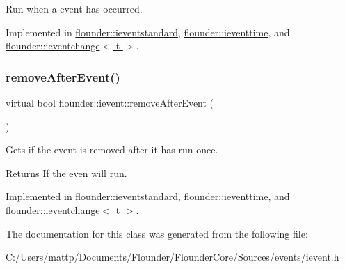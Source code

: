 Run when a event has occurred. 



Implemented in \hyperlink{classflounder_1_1ieventstandard_ac559905d5c7f4067ecc474742a1e24b8}{flounder\+::ieventstandard}, \hyperlink{classflounder_1_1ieventtime_abef43da596dc22fc9b7104fff88c1a9d}{flounder\+::ieventtime}, and \hyperlink{classflounder_1_1ieventchange_ab4977a4a6c22b93e82ea294d0d906a9e}{flounder\+::ieventchange$<$ t $>$}.

\mbox{\label{classflounder_1_1ievent_a7017c8803df2397758980cb61020e801}} 
\subsubsection{\texorpdfstring{remove\+After\+Event()}{removeAfterEvent()}}
{\footnotesize\ttfamily virtual bool flounder\+::ievent\+::remove\+After\+Event (\begin{DoxyParamCaption}{ }\end{DoxyParamCaption})\hspace{0.3cm}{\ttfamily [pure virtual]}}



Gets if the event is removed after it has run once. 

\begin{DoxyReturn}{Returns}
If the even will run. 
\end{DoxyReturn}


Implemented in \hyperlink{classflounder_1_1ieventstandard_ac54c83ea92a634d2f389e712afda83fc}{flounder\+::ieventstandard}, \hyperlink{classflounder_1_1ieventtime_af64c856310e8249439d0c847943e3490}{flounder\+::ieventtime}, and \hyperlink{classflounder_1_1ieventchange_a6c7872d176004b7dfb4a01e90221976d}{flounder\+::ieventchange$<$ t $>$}.



The documentation for this class was generated from the following file\+:\begin{DoxyCompactItemize}
\item 
C\+:/\+Users/mattp/\+Documents/\+Flounder/\+Flounder\+Core/\+Sources/events/ievent.\+h\end{DoxyCompactItemize}
